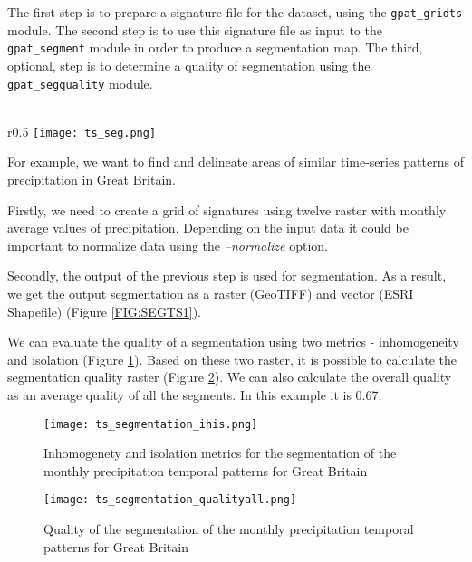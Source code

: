 The first step is to prepare a signature file for the dataset, using the {\tt gpat\_gridts} module.
The second step is to use this signature file as input to the {\tt gpat\_segment} module in order to produce a segmentation map. 
The third, optional, step is to determine a quality of segmentation using the {\tt gpat\_segquality} module.\\\\

\newpage

\begin{wrapfigure}{r}{0.5\textwidth}
	\centering
	\texttt{[image: ts\_seg.png]}
	\caption{Segments of the monthly precipitation temporal patterns for Great Britain}
	\label{FIG:SEGTS1}
\end{wrapfigure}

For example, we want to find and delineate areas of similar time-series patterns of precipitation in Great Britain. 

Firstly, we need to create a grid of signatures using twelve raster with monthly average values of precipitation.
Depending on the input data it could be important to normalize data using the {\it --normalize} option.

Secondly, the output of the previous step is used for segmentation.
As a result, we get the output segmentation as a raster (GeoTIFF) and vector (ESRI Shapefile) (Figure \ref{FIG:SEGTS1}).

We can evaluate the quality of a segmentation using two metrics - inhomogeneity and isolation (Figure \ref{FIG:SEGTS2}).
Based on these two raster, it is possible to calculate the segmentation quality raster (Figure \ref{FIG:SEGTS3}).
We can also calculate the overall quality as an average quality of all the segments.
In this example it is 0.67.

\begin{figure}[H]
	\centering
	\texttt{[image: ts\_segmentation\_ihis.png]}
	\caption{Inhomogenety and isolation metrics for the segmentation of the monthly precipitation temporal patterns for Great Britain}
	\label{FIG:SEGTS2}
\end{figure}

\begin{figure}[H]
	\centering
	\texttt{[image: ts\_segmentation\_qualityall.png]}
	\caption{Quality of the segmentation of the monthly precipitation temporal patterns for Great Britain}
	\label{FIG:SEGTS3}
\end{figure}

